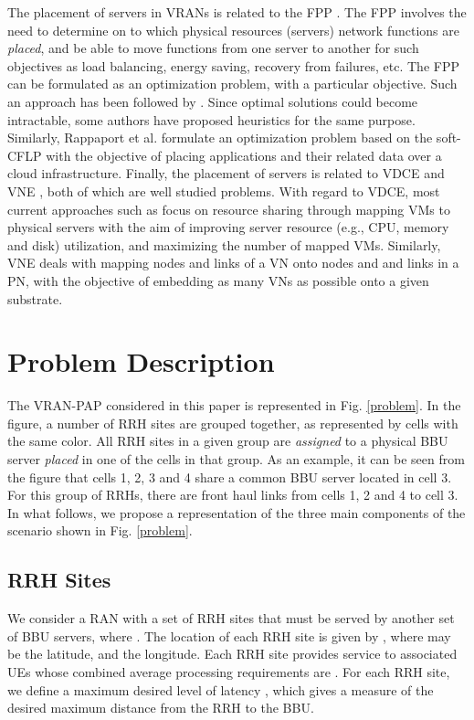 \documentclass[conference]{IEEEtran}
\begin{document}
\indent The placement of servers in \acp{VRAN} is related to the \ac{FPP} \cite{MijumbiNFV15}. The \ac{FPP} involves the need to determine on to which physical resources (servers) network functions are \textit{placed}, and be able to move functions from one server to another for such objectives as load balancing, energy saving, recovery from failures, etc. The \ac{FPP} can be formulated as an optimization problem, with a particular objective. Such an approach has been followed by \cite{BastaA2014, Moens14, Bagaa14}. Since optimal solutions could become intractable, some authors \cite{MijumbiNFV15, Xia15, Yoshida14} have proposed heuristics for the same purpose. Similarly, Rappaport et al. \cite{Rappaport13} formulate an optimization problem based on the soft-\ac{CFLP} with the objective of placing applications and their related data over a cloud infrastructure. Finally, the placement of servers is related to \ac{VDCE} \cite{BariCST13} and \ac{VNE} \cite{ShidIM15, path, rl, aims, sdn, neurofuzzy, neural}, both of which are well studied problems. With regard to \ac{VDCE}, most current approaches such as \cite{MengXia10, RabbaniMG13} focus on resource sharing through mapping \acp{VM} to physical servers with the aim of improving server resource (e.g., CPU, memory and disk) utilization, and maximizing the number of mapped \acp{VM}. Similarly, \ac{VNE} deals with mapping nodes and links of a \ac{VN} onto nodes and and links in a \ac{PN}, with the objective of embedding as many \acp{VN} as possible onto a given substrate.

\section{Problem Description} \label{desc}
The \ac{VRAN-PAP} considered in this paper is represented in Fig. \ref{problem}. In the figure, a number of \ac{RRH} sites  are grouped together, as represented by cells with the same color. All RRH sites in a given group are \textit{assigned} to a physical BBU server \textit{placed} in one of the cells in that group. As an example, it can be seen from the figure that cells 1, 2, 3 and 4 share a common BBU server located in cell 3. For this group of RRHs, there are front haul links from cells 1, 2 and 4 to cell 3. In what follows, we propose a representation of the three main components of the scenario shown in Fig. \ref{problem}.
\subsection{\ac{RRH} Sites}
We consider a \ac{RAN} with a set  of \ac{RRH} sites that must be served by another set  of BBU servers, where . The location of each \ac{RRH} site  is given by , where  may be the latitude, and  the longitude. Each \ac{RRH} site  provides service to  associated \acp{UE} whose combined average processing requirements are . For each \ac{RRH} site, we define a maximum desired level of latency , which gives a measure of the desired maximum distance from the \ac{RRH} to the \ac{BBU}. 
\end{document}
